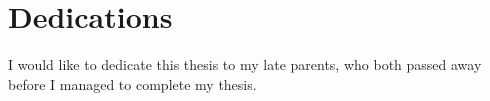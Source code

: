 \chapter*{Dedications}

I would like to dedicate this thesis to my late parents, who both passed away before I managed to complete my thesis.

